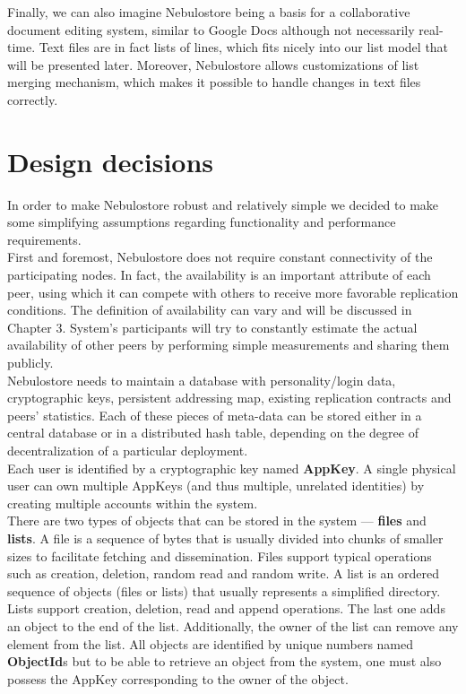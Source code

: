 \documentclass{pracamgren}
\begin{document}
Finally, we can also imagine Nebulostore being a basis for a collaborative document editing system, similar to Google Docs although not necessarily real-time. Text files are in fact lists of lines, which fits nicely into our list model that will be presented later. Moreover, Nebulostore allows customizations of list merging mechanism, which makes it possible to handle changes in text files correctly.\\

\section{Design decisions}

In order to make Nebulostore robust and relatively simple we decided to make some simplifying assumptions regarding functionality and performance requirements.\\

First and foremost, Nebulostore does not require constant connectivity of the participating nodes. In fact, the availability is an important attribute of each peer, using which it can compete with others to receive more favorable replication conditions. The definition of availability can vary and will be discussed in Chapter 3. System's participants will try to constantly estimate the actual availability of other peers by performing simple measurements and sharing them publicly.\\

Nebulostore needs to maintain a database with personality/login data, cryptographic keys, persistent addressing map, existing replication contracts and peers' statistics. Each of these pieces of meta-data can be stored either in a central database or in a distributed hash table, depending on the degree of decentralization of a particular deployment.\\

Each user is identified by a cryptographic key named {\bf AppKey}. A single physical user can own multiple AppKeys (and thus multiple, unrelated identities) by creating multiple accounts within the system.\\

There are two types of objects that can be stored in the system --- {\bf files} and {\bf lists}. A file is a sequence of bytes that is usually divided into chunks of smaller sizes to facilitate fetching and dissemination. Files support typical operations such as creation, deletion, random read and random write. A list is an ordered sequence of objects (files or lists) that usually represents a simplified directory. Lists support creation, deletion, read and append operations. The last one adds an object to the end of the list. Additionally, the owner of the list can remove any element from the list. All objects are identified by unique numbers named {\bf ObjectId}s but to be able to retrieve an object from the system, one must also possess the AppKey corresponding to the owner of the object.\\
\end{document}
